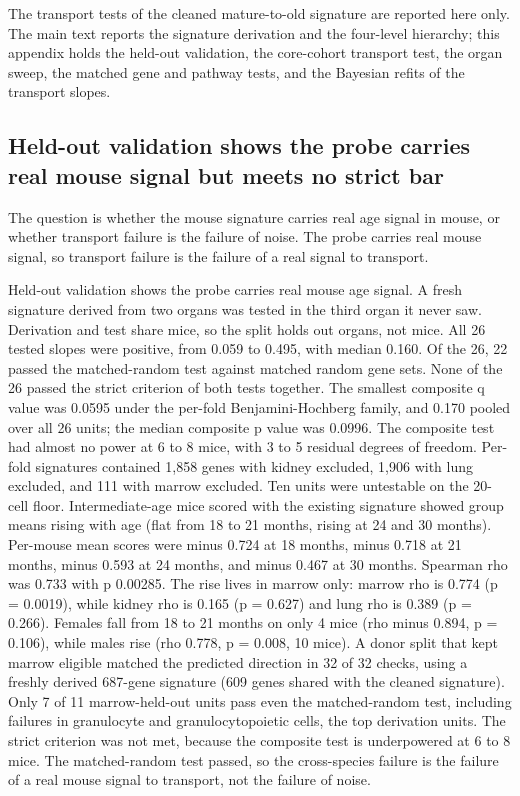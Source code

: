 \documentclass[11pt]{article}
\begin{document}
The transport tests of the cleaned mature-to-old signature are reported here only. The main text reports the signature derivation and the four-level hierarchy; this appendix holds the held-out validation, the core-cohort transport test, the organ sweep, the matched gene and pathway tests, and the Bayesian refits of the transport slopes.

\subsection*{Held-out validation shows the probe carries real mouse signal but meets no strict bar}

The question is whether the mouse signature carries real age signal in mouse, or whether transport failure is the failure of noise. The probe carries real mouse signal, so transport failure is the failure of a real signal to transport.

Held-out validation shows the probe carries real mouse age signal. A fresh signature derived from two organs was tested in the third organ it never saw. Derivation and test share mice, so the split holds out organs, not mice. All 26 tested slopes were positive, from 0.059 to 0.495, with median 0.160. Of the 26, 22 passed the matched-random test against matched random gene sets. None of the 26 passed the strict criterion of both tests together. The smallest composite q value was 0.0595 under the per-fold Benjamini-Hochberg family, and 0.170 pooled over all 26 units; the median composite p value was 0.0996. The composite test had almost no power at 6 to 8 mice, with 3 to 5 residual degrees of freedom. Per-fold signatures contained 1,858 genes with kidney excluded, 1,906 with lung excluded, and 111 with marrow excluded. Ten units were untestable on the 20-cell floor. Intermediate-age mice scored with the existing signature showed group means rising with age (flat from 18 to 21 months, rising at 24 and 30 months). Per-mouse mean scores were minus 0.724 at 18 months, minus 0.718 at 21 months, minus 0.593 at 24 months, and minus 0.467 at 30 months. Spearman rho was 0.733 with p 0.00285. The rise lives in marrow only: marrow rho is 0.774 (p = 0.0019), while kidney rho is 0.165 (p = 0.627) and lung rho is 0.389 (p = 0.266). Females fall from 18 to 21 months on only 4 mice (rho minus 0.894, p = 0.106), while males rise (rho 0.778, p = 0.008, 10 mice). A donor split that kept marrow eligible matched the predicted direction in 32 of 32 checks, using a freshly derived 687-gene signature (609 genes shared with the cleaned signature). Only 7 of 11 marrow-held-out units pass even the matched-random test, including failures in granulocyte and granulocytopoietic cells, the top derivation units. The strict criterion was not met, because the composite test is underpowered at 6 to 8 mice. The matched-random test passed, so the cross-species failure is the failure of a real mouse signal to transport, not the failure of noise.
\end{document}
